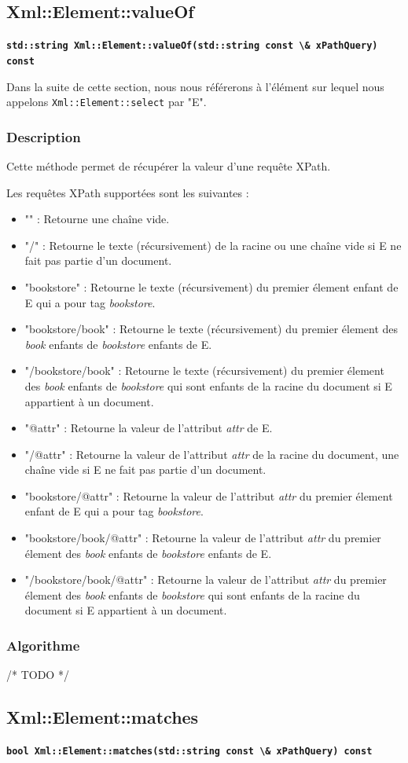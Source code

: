     \subsection{Xml::Element::valueOf}

    \textbf{\lstinline$std::string Xml::Element::valueOf(std::string const \& xPathQuery) const$}

    Dans la suite de cette section, nous nous référerons à l'élément sur lequel nous appelons \lstinline$Xml::Element::select$ par "E".

    \subsubsection{Description}
    Cette méthode permet de récupérer la valeur d'une requête XPath.

    Les requêtes XPath supportées sont les suivantes :
    \begin{itemize}
        \item "" : Retourne une chaîne vide.
        \item "/" : Retourne le texte (récursivement) de la racine ou une chaîne vide si E ne fait pas partie d'un document.
        \item "bookstore" : Retourne le texte (récursivement) du premier élement enfant de E qui a pour tag \textit{bookstore}.
        \item "bookstore/book" : Retourne le texte (récursivement) du premier élement des \textit{book} enfants de \textit{bookstore} enfants de E.
        \item "/bookstore/book" : Retourne le texte (récursivement) du premier élement des \textit{book} enfants de \textit{bookstore} qui sont enfants de la racine du document si E appartient à un document.
        \item "@attr" : Retourne la valeur de l'attribut \textit{attr} de E.
        \item "/@attr" : Retourne la valeur de l'attribut \textit{attr} de la racine du document, une chaîne vide si E ne fait pas partie d'un document.
        \item "bookstore/@attr" : Retourne la valeur de l'attribut \textit{attr} du premier élement enfant de E qui a pour tag \textit{bookstore}.
        \item "bookstore/book/@attr" : Retourne la valeur de l'attribut \textit{attr} du premier élement des \textit{book} enfants de \textit{bookstore} enfants de E.
        \item "/bookstore/book/@attr" : Retourne la valeur de l'attribut \textit{attr} du premier élement des \textit{book} enfants de \textit{bookstore} qui sont enfants de la racine du document si E appartient à un document.
    \end{itemize}

    \subsubsection{Algorithme}

    /* TODO */

    \subsection{Xml::Element::matches}

    \textbf{\lstinline$bool Xml::Element::matches(std::string const \& xPathQuery) const$}
